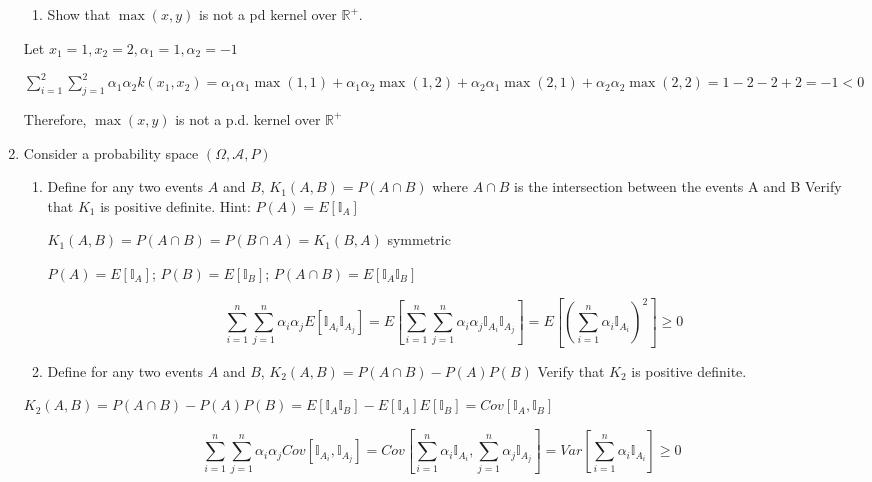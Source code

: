 \documentclass[11pt]{article}
\begin{document}
\begin{enumerate}
\begin{enumerate}
\item Show that $\max(x,y)$ is not a pd kernel over  $\mathbb{R}^+$. 
\end{enumerate}



Let $x_1=1,x_2=2,\alpha_1=1,\alpha_2=-1$ 

$\sum_{i=1}^2\sum_{j=1}^2\alpha_1\alpha_2 k(x_1,x_2)=\alpha_1\alpha_1 \max(1,1)+\alpha_1\alpha_2 \max(1,2)+\alpha_2\alpha_1 \max(2,1)+\alpha_2\alpha_2 \max(2,2)=1-2-2+2=-1<0$

Therefore, $\max(x,y)$ is not a p.d. kernel over  $\mathbb{R}^+$


\item Consider a probability space $(\Omega,\mathcal{A},P)$



\begin{enumerate}
\item Define for any two events $A$ and $B$, $K_1(A,B)=P(A \cap B)$
where $A \cap B$ is the intersection between the events A and B 
Verify that $K_1$ is positive definite. Hint: $P(A)=E[\mathbb{I}_A]$

\vspace{2mm}
$K_1(A,B)=P(A \cap B)=P(B \cap A)=K_1(B,A)$ symmetric

$P(A)=E[\mathbb{I}_A]$; $P(B)=E[\mathbb{I}_B]$; $P(A\cap B)=E[\mathbb{I}_A\mathbb{I}_B]$

$$\sum_{i=1}^n\sum_{j=1}^n\alpha_i\alpha_jE[\mathbb{I}_{A_i}\mathbb{I}_{A_j}]=E[\sum_{i=1}^n\sum_{j=1}^n\alpha_i\alpha_j\mathbb{I}_{A_i}\mathbb{I}_{A_j}]=E[(\sum_{i=1}^n\alpha_i\mathbb{I}_{A_i})^2]\ge0$$


\item Define for any two events $A$ and $B$, 
$K_2(A,B)=P(A \cap B)-P(A)P(B)$
Verify that $K_2$ is positive definite. 
\end{enumerate}

\vspace{2mm}
$K_2(A,B)=P(A \cap B)-P(A)P(B)=E[\mathbb{I}_A\mathbb{I}_B]-E[\mathbb{I}_A]E[\mathbb{I}_B]=Cov[\mathbb{I}_A,\mathbb{I}_B]$

$$\sum_{i=1}^n\sum_{j=1}^n\alpha_i\alpha_jCov[\mathbb{I}_{A_i},\mathbb{I}_{A_j}]=Cov[\sum_{i=1}^n\alpha_i\mathbb{I}_{A_i},\sum_{j=1}^n\alpha_j\mathbb{I}_{A_j}]=Var[\sum_{i=1}^n\alpha_i\mathbb{I}_{A_i}]\ge 0$$



\end{enumerate}
\end{document}
